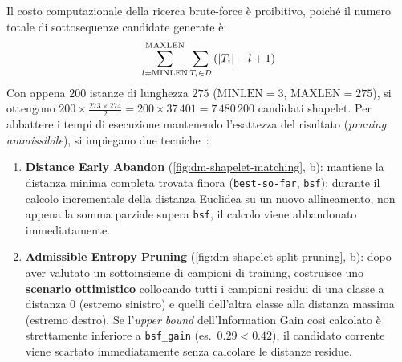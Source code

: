 Il costo computazionale della ricerca brute-force \`e proibitivo, poich\'e il numero totale di sottosequenze candidate generate \`e:
\begin{equation}
    \sum_{l=\text{MINLEN}}^{\text{MAXLEN}} \sum_{T_i \in \mathcal{D}} \left(\left|T_i\right| - l + 1\right)
\end{equation}
Con appena $200$ istanze di lunghezza $275$ ($\text{MINLEN} = 3$, $\text{MAXLEN} = 275$), si ottengono $200 \times \frac{273 \times 274}{2} = 200 \times 37\,401 = 7\,480\,200$ candidati shapelet. Per abbattere i tempi di esecuzione mantenendo l'esattezza del risultato (\textit{pruning ammissibile}), si impiegano due tecniche~\cite{ye2009}:
\begin{enumerate}
    \item \textbf{Distance Early Abandon} (\autoref{fig:dm-shapelet-matching}, b): mantiene la distanza minima completa trovata finora (\texttt{best-so-far}, \texttt{bsf}); durante il calcolo incrementale della distanza Euclidea su un nuovo allineamento, non appena la somma parziale supera \texttt{bsf}, il calcolo viene abbandonato immediatamente.
    \item \textbf{Admissible Entropy Pruning} (\autoref{fig:dm-shapelet-split-pruning}, b): dopo aver valutato un sottoinsieme di campioni di training, costruisce uno \textbf{scenario ottimistico} collocando tutti i campioni residui di una classe a distanza $0$ (estremo sinistro) e quelli dell'altra classe alla distanza massima (estremo destro). Se l'\textit{upper bound} dell'Information Gain cos\`i calcolato \`e strettamente inferiore a \texttt{bsf\_gain} (es.\ $0.29 < 0.42$), il candidato corrente viene scartato immediatamente senza calcolare le distanze residue.
\end{enumerate}

\FloatBarrier
